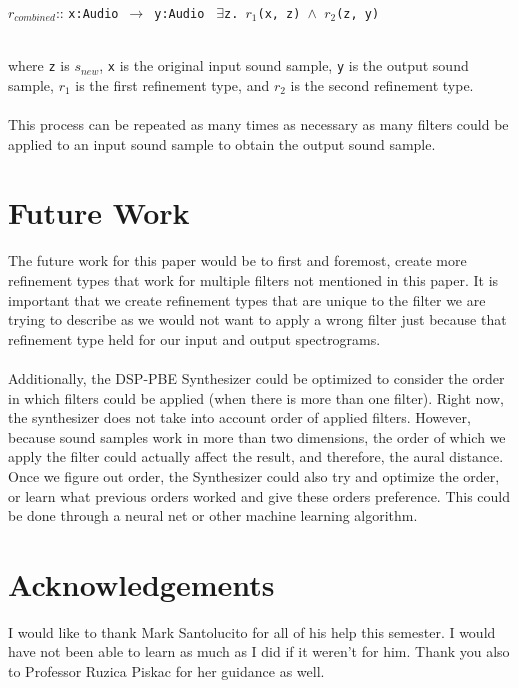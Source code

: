 \documentclass[english, 11pt]{article}
\begin{document}
\centerline{$r_{combined}$:: \texttt{x:Audio} $\,\to\,$ \texttt{y:Audio} \textbar \texttt{ $\exists$z. $r_1$(x, z) $\land$ $r_2$(z, y)}} ~\\
where \texttt{z} is $s_{new}$, \texttt{x} is the original input sound sample, \texttt{y} is the output sound sample, $r_1$ is the first refinement type, and $r_2$ is the second refinement type. \\ \\
This process can be repeated as many times as necessary as many filters could be applied to an input sound sample to obtain the output sound sample. 
\begin{comment}
The new feedback loop would look something like this: \\
\texttt{[image: CPSC490Flow2.png]}
\end{comment}




\section{Future Work}

The future work for this paper would be to first and foremost, create more refinement types that work for multiple filters not mentioned in this paper. It is important that we create refinement types that are unique to the filter we are trying to describe as we would not want to apply a wrong filter just because that refinement type held for our input and output spectrograms. \\ \\
Additionally, the DSP-PBE Synthesizer could be optimized to consider the order in which filters could be applied (when there is more than one filter). Right now, the synthesizer does not take into account order of applied filters. However, because sound samples work in more than two dimensions, the order of which we apply the filter could actually affect the result, and therefore, the aural distance. Once we figure out order, the Synthesizer could also try and optimize the order, or learn what previous orders worked and give these orders preference. This could be done through a neural net or other machine learning algorithm.

\section{Acknowledgements}
I would like to thank Mark Santolucito for all of his help this semester. I would have not been able to learn as much as I did if it weren't for him. Thank you also to Professor Ruzica Piskac for her guidance as well.
\end{document}
